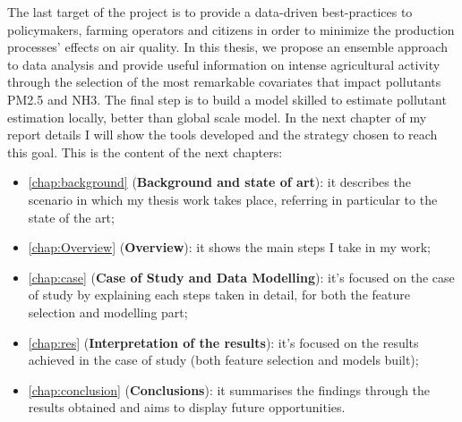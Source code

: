The last target of the project is to provide a data-driven best-practices to policymakers, farming operators and citizens in order to minimize the production processes' effects on air quality.
\bigskip
In this thesis, we propose an ensemble approach to data analysis and provide useful information on intense agricultural activity through the selection of the most remarkable covariates that impact pollutants PM2.5 and NH3. 
The final step is to build a model skilled to estimate pollutant estimation locally, better than global scale model.  
In the next chapter of my report details I will show the tools developed and the strategy chosen to reach this goal. 
This is the content of the next chapters:

\begin{itemize}
  \item \autoref{chap:background} (\textbf{Background and state of art}): it describes the scenario in which my thesis work takes place, referring in particular to the state of the art;
  \item \autoref{chap:Overview} (\textbf{Overview}): it shows the main steps I take in my work;
  \item \autoref{chap:case} (\textbf{Case of Study and Data Modelling}): it's focused on the case of study by explaining each steps taken in detail, for both the feature selection and modelling part;
 \item \autoref{chap:res} (\textbf{Interpretation of the results}): it's focused on the results achieved in the case of study (both feature selection and models built);
 \item \autoref{chap:conclusion} (\textbf{Conclusions}): it summarises the findings through the results obtained and aims to display future opportunities.  
\end{itemize}

